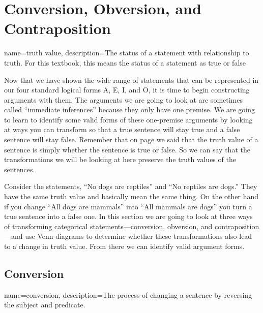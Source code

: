 

\section{Conversion, Obversion, and Contraposition}
\label{sec:conv_obv_cont}

{
  name=truth value,
  description={The status of a statement with relationship to truth. For  this textbook, this means the status of a statement as true or false}
}

Now that we have shown the wide range of statements that can be represented in our four standard logical forms A, E, I, and O, it is time to begin constructing arguments with them. The arguments we are going to look at are sometimes called ``immediate inferences'' because they only have one premise. We are going to learn to identify some valid forms of these one-premise arguments by looking at ways you can transform so that a true sentence will stay true and a false sentence will stay false. Remember that on page \pageref{def:Truth_value} we said that the \gls{truth value} of a sentence is simply whether the sentence is true or false. So we can say that the transformations we will be looking at here preserve the truth values of the sentences.

Consider the statements, ``No dogs are reptiles'' and ``No reptiles are dogs.'' They have the same truth value and basically mean the same thing. On the other hand if you change ``All dogs are mammals'' into ``All mammals are dogs'' you turn a true sentence into a false one. In this section we are going to look at three ways of transforming categorical statements---conversion, obversion, and contraposition---and use Venn diagrams to determine whether these transformations also lead to a change in truth value. From there we can identify valid argument forms. 

\subsection{Conversion}

{
name=conversion,
description={The process of changing a sentence by reversing the subject and predicate.}
}


